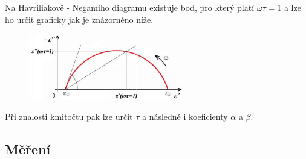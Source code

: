 \documentclass{article}
\begin{document}
Na Havriliakově - Negamiho diagramu existuje bod, pro který platí \(\omega \tau = 1\) a lze ho určit graficky jak je znázorněno níže.
\begin{figure}[H]
    \centering
    \includegraphics[width=0.6\textwidth]{obrazky/teorie2.png}
\end{figure}
Při znalosti kmitočtu pak lze určit \(\tau\) a následně i koeficienty \(\alpha\) a \(\beta\).


\newpage
\subsection*{Měření}
\end{document}

